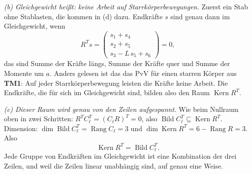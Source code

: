 \emph{(b) Gleichgewicht heißt: keine Arbeit auf Starrkörperbewegungen.} Zuerst ein Stab ohne
Stablasten, die kommen in (d) dazu. Endkräfte $s$ sind genau dann im Gleichgewicht, wenn
\[
  R^T s = \begin{pmatrix} s_1 + s_4 \\ s_2 + s_5 \\ s_3 - L\,s_5 + s_6 \end{pmatrix} = 0 ,
\]
das sind Summe der Kräfte längs, Summe der Kräfte quer und Summe der Momente um $a$. Anders gelesen
ist das das PvV für einen starren Körper aus \textbf{TM1}: Auf jeder Starrkörperbewegung leisten die
Kräfte keine Arbeit. Die Endkräfte, die für sich im Gleichgewicht sind, bilden also den Raum
$\operatorname{Kern} R^T$.

\emph{(c) Dieser Raum wird genau von den Zeilen aufgespannt.} Wie beim Nullraum oben in zwei
Schritten: $R^T C_\ell^T = (C_\ell R)^T = 0$, also $\operatorname{Bild} C_\ell^T
\subseteq \operatorname{Kern} R^T$. Dimension: $\dim \operatorname{Bild} C_\ell^T = \operatorname{Rang}
C_\ell = 3$ und $\dim \operatorname{Kern} R^T = 6 - \operatorname{Rang} R = 3$. Also
\[
  \operatorname{Kern} R^T = \operatorname{Bild} C_\ell^T .
\]
Jede Gruppe von Endkräften im Gleichgewicht ist eine Kombination der drei Zeilen, und weil die
Zeilen linear unabhängig sind, auf genau eine Weise.

